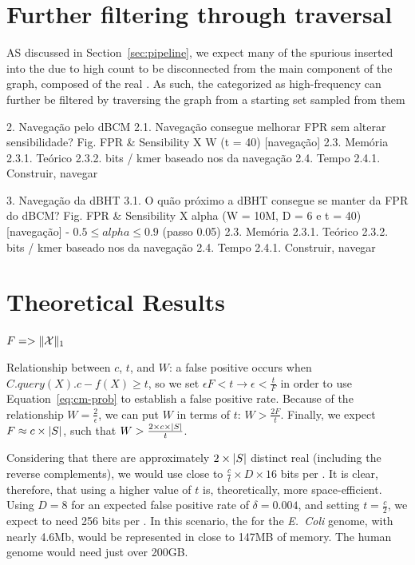 \section{Further filtering through traversal}

AS discussed in Section~\ref{sec:pipeline}, we expect many of the spurious  inserted into the \dBG due to high count to be disconnected from the main component of the graph, composed of the real . As such, the  categorized as high-frequency can further be filtered by traversing the graph from a starting set sampled from them

2. Navegação pelo dBCM
2.1. Navegação consegue melhorar FPR sem alterar sensibilidade?
Fig. FPR \& Sensibility X W (t = 40) [navegação]
2.3. Memória
2.3.1. Teórico
2.3.2. bits / kmer baseado nos  da navegação
2.4. Tempo
2.4.1. Construir, navegar

3. Navegação da dBHT
3.1. O quão próximo a dBHT consegue se manter da FPR do dBCM?
Fig. FPR \& Sensibility X alpha (W = 10M, D = 6 e t = 40) [navegação]
- $0.5 \leq alpha \leq 0.9$ (passo 0.05)
2.3. Memória
2.3.1. Teórico
2.3.2. bits / kmer baseado nos  da navegação
2.4. Tempo
2.4.1. Construir, navegar


\section{Theoretical Results}


$F => \|\readset\|_1$

Relationship between $c$, $t$, and $W$: a false positive occurs when $C.\mathit{query}(X).c - f(X) \geq t$, so we set $\epsilon F < t \rightarrow \epsilon < \frac{t}{F}$ in order to use Equation~\ref{eq:cm-prob} to establish a false positive rate. Because of the relationship $W = \frac{2}{\epsilon}$, we can put $W$ in terms of $t$: $W > \frac{2F}{t}$. Finally, we expect $F \approx c \times |\strname{S}|$, such that $W > \frac{2 \times c \times |\strname{S}|}{t}$.

Considering that there are approximately $2 \times |\strname{S}|$ distinct real  (including the reverse complements), we would use close to  $\frac{c}{t} \times D \times 16$ bits per \kmer. It is clear, therefore, that using a higher value of $t$ is, theoretically, more space-efficient. Using $D = 8$ for an expected false positive rate of $\delta = 0.004$, and setting $t = \frac{c}{2}$, we expect to need 256 bits per \kmer. In this scenario, the \dBG for the \emph{E.~Coli} genome, with nearly 4.6Mb, would be represented in close to 147MB of memory. The human genome would need just over 200GB.

